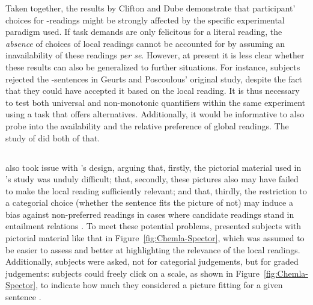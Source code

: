 \documentclass[fleqn,reqno,10pt,draft]{article}
\newcommand{\as}{\acro{as}}
\renewcommand{\es}{\acro{es}}
\begin{document}
Taken together, the results by Clifton and Dube demonstrate that
participant' choices for \as-readings might be strongly affected by
the specific experimental paradigm used. If task demands are only
felicitous for a literal reading, the \emph{absence} of choices of
local readings cannot be accounted for by assuming an inavailability
of these readings \emph{per se}. However, at present it is less clear whether these results
can also be generalized to further situations. For instance, subjects
rejected the \es-sentences in Geurts and Poscoulous' original study,
despite the fact that they could have accepted it based on the local
reading. It is thus necessary to test both universal and non-monotonic
quantifiers within the same experiment using a task that offers
alternatives. Additionally, it would be informative to also probe into
the availability and the relative preference of global readings. The
study of \citet{ChemlaSpector2010:Experimental-Ev} did both of that.

\subsection{\citet{ChemlaSpector2010:Experimental-Ev}}
\label{sec:Chemla-Spector}

\citet{ChemlaSpector2010:Experimental-Ev} also took issue with
\citeauthor{GeurtsPouscoulous2009:Embedded-Implic}'s design, arguing
that, firstly, the pictorial material used in
\citeauthor{GeurtsPouscoulous2009:Embedded-Implic}'s study was unduly
difficult; that, secondly, these pictures also may have failed to make
the local reading sufficiently relevant; and that, thirdly, the
restriction to a categorial choice (whether the sentence fits the
picture of not) may induce a bias against non-preferred readings in
cases where candidate readings stand in entailment relations
\citep[c.f.][for this latter
criticism]{Sauerland2010:Embedded-Implic}. To meet these potential
problems, \citet{ChemlaSpector2010:Experimental-Ev} presented subjects
with pictorial material like that in Figure~\ref{fig:Chemla-Spector},
which was assumed to be easier to assess and better at highlighting
the relevance of the local readings. Additionally, subjects were
asked, not for categorial judgements, but for graded judgements:
subjects could freely click on a scale, as shown in
Figure~\ref{fig:Chemla-Spector}, to indicate how much they considered
a picture fitting for a given sentence \citep[c.f.][for more on this
method]{Chemla2009:Presuppositions}.
\end{document}
